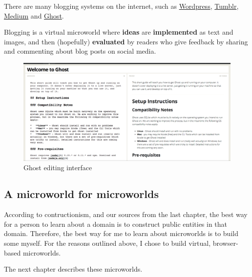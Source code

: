 There are many blogging systems on the internet, such as \href{http://wordpress.org/}{Wordpress}, \href{http://tumblr.com}{Tumblr}, \href{http://medium.com}{Medium} and \href{http://ghost.org}{Ghost}. 

Blogging is a virtual microworld where \textbf{ideas} are \textbf{implemented} as text and images, and then (hopefully) \textbf{evaluated} by readers who give feedback by sharing and commenting about blog posts on social media. 

\begin{figure}[ht!]
\centering
\includegraphics[width=123mm]{img/ghost.png}
\caption{Ghost editing interface}
\label{overflow}
\end{figure}

\subsection{A microworld for microworlds}

According to contructionism, and our sources from the last chapter, the best way for a person to learn about a domain is to construct public entities in that domain. Therefore, the best way for me to learn about microworlds is to build some myself. For the reasons outlined above, I chose to build virtual, browser-based microworlds. 

The next chapter describes these microworlds. 
